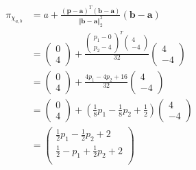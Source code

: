 \begin{align*}
  \pi_{\chi_{a,b}} &= a + \frac{(\mathbf{p} - \mathbf{a})^T (\mathbf{b} - \mathbf{a})}{\Vert \mathbf{b} - \mathbf{a} \Vert^2_2} (\mathbf{b} - \mathbf{a})  \\
  &= \left(\begin{smallmatrix}0 \\ 4 \end{smallmatrix}\right) + \frac{\left(\begin{smallmatrix}p_1 - 0 \\ p_2 - 4 \end{smallmatrix}\right)^T \left(\begin{smallmatrix}4 \\ -4 \end{smallmatrix}\right)}{32} \left(\begin{smallmatrix}4 \\ -4 \end{smallmatrix}\right) \\
  &= \left(\begin{smallmatrix}0 \\ 4 \end{smallmatrix}\right) + \frac{4p_1 - 4p_2 + 16}{32} \left(\begin{smallmatrix}4 \\ -4 \end{smallmatrix}\right) \\
  &= \left(\begin{smallmatrix}0 \\ 4 \end{smallmatrix}\right) + \left(\frac{1}{8} p_1 - \frac{1}{8} p_2 + \frac{1}{2} \right) \left(\begin{smallmatrix}4 \\ -4 \end{smallmatrix}\right) \\
  &=\begin{pmatrix}
      \frac{1}{2} p_1 - \frac{1}{2} p_2 + 2 \\
      \frac{1}{2} - p_1 + \frac{1}{2} p_2 + 2 \\
    \end{pmatrix}
\end{align*}
%
%
\newpage
{}
%

